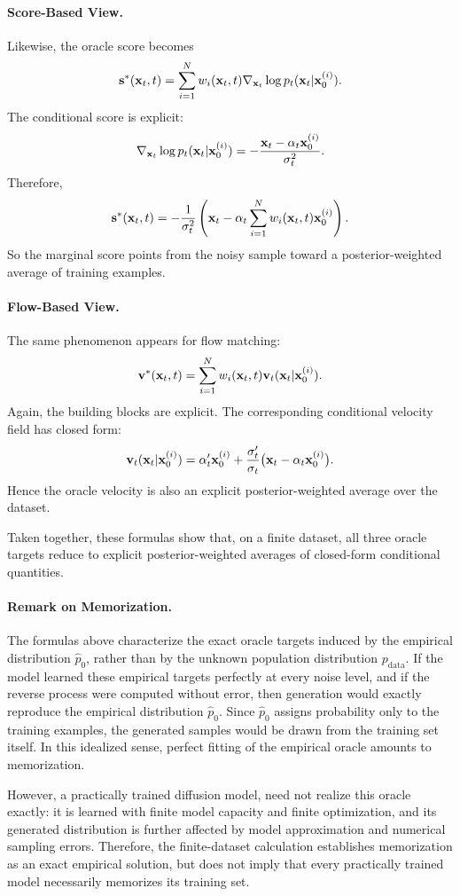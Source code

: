 {\paragraph{Score-Based View.}
Likewise, the oracle score becomes
\[
\mathbf{s}^*({\mathbf{x}}_t,t)
=
\sum_{i=1}^N
w_i({\mathbf{x}}_t,t) 
\nabla_{{\mathbf{x}}_t}\log p_t({\mathbf{x}}_t|{\mathbf{x}}_0^{(i)}).
\]
The conditional score is explicit:
\[
\nabla_{{\mathbf{x}}_t}\log p_t({\mathbf{x}}_t|{\mathbf{x}}_0^{(i)})
=
-\frac{{\mathbf{x}}_t-\alpha_t{\mathbf{x}}_0^{(i)}}{\sigma_t^2}.
\]
Therefore,
\[
\mathbf{s}^*({\mathbf{x}}_t,t)
=
-\frac{1}{\sigma_t^2}
\left(
{\mathbf{x}}_t-\alpha_t\sum_{i=1}^N w_i({\mathbf{x}}_t,t) {\mathbf{x}}_0^{(i)}
\right).
\]
So the marginal score points from the noisy sample toward a posterior-weighted average of training examples.

\paragraph{Flow-Based View.}
The same phenomenon appears for flow matching:
\[
\mathbf{v}^*({\mathbf{x}}_t,t)
=
\sum_{i=1}^N
w_i({\mathbf{x}}_t,t) 
\mathbf{v}_t({\mathbf{x}}_t|{\mathbf{x}}_0^{(i)}).
\]
Again, the building blocks are explicit. The corresponding conditional velocity field has closed form:
\[
\mathbf{v}_t({\mathbf{x}}_t|{\mathbf{x}}_0^{(i)})
=
{\alpha}'_t {\mathbf{x}}_0^{(i)}
+
\frac{{\sigma}'_t}{\sigma_t}\bigl({\mathbf{x}}_t-\alpha_t{\mathbf{x}}_0^{(i)}\bigr).
\]
Hence the oracle velocity is also an explicit posterior-weighted average over the dataset.

Taken together, these formulas show that, on a finite dataset, all three oracle targets reduce to explicit posterior-weighted averages of closed-form conditional quantities.

\paragraph{Remark on Memorization.} The formulas above characterize the exact oracle targets induced by the empirical distribution $\hat p_0$, rather than by the unknown population distribution $p_{\mathrm{data}}$. If the model learned these empirical targets perfectly at every noise level, and if the reverse process were computed without error, then generation would exactly reproduce the empirical distribution $\hat p_0$. Since $\hat p_0$ assigns probability only to the training examples, the generated samples would be drawn from the training set itself. In this idealized sense, perfect fitting of the empirical oracle amounts to memorization.

However, a practically trained diffusion model, need not realize this oracle exactly: it is learned with finite model capacity and finite optimization, and its generated distribution is further affected by model approximation and numerical sampling errors. Therefore, the finite-dataset calculation establishes memorization as an exact empirical solution, but does not imply that every practically trained model necessarily memorizes its training set.

}


